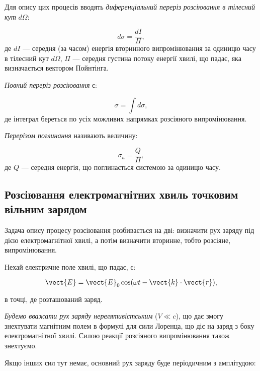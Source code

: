 Для опису цих процесів вводять \textit{диференціальний переріз розсіювання в тілесний кут} \( d\Omega \):

\begin{equation}
d\sigma = \frac{dI}{\Pi},
\label{eq:differential_cross_section}
\end{equation}
де \( dI \) --- середня (за часом) енергія вторинного випромінювання за одиницю часу в тілесний кут \( d\Omega \), \( \Pi \) — середня густина потоку
енергії хвилі, що падає, яка визначається вектором Пойнтінга.

\textit{Повний переріз розсіювання} є:

\begin{equation}
\sigma = \int d\sigma,
\label{eq:total_cross_section}
\end{equation}
де інтеграл береться по усіх можливих напрямках розсіяного випромінювання.

\textit{Перерізом поглинання} називають величину:

\begin{equation}
\sigma_a = \frac{Q}{\Pi},
\label{eq:absorption_cross_section}
\end{equation}
де \( Q \) --- середня енергія, що поглинається системою за одиницю часу.

\subsection*{Розсіювання електромагнітних хвиль точковим вільним зарядом}

Задача опису процесу розсіювання розбивається на дві: визначити рух заряду під дією електромагнітної хвилі, а потім визначити вторинне, тобто розсіяне,
випромінювання.

Нехай електричне поле хвилі, що падає, є:

\begin{equation}
\vect{E} = \vect{E}_0 \cos(\omega t - \vect{k} \cdot \vect{r}),
\label{eq:incident_wave}
\end{equation}

в точці, де розташований заряд.

\textit{Будемо вважати рух заряду нерелятивістським} (\( V \ll c \)), що дає змогу знехтувати магнітним полем в формулі для сили Лоренца, що діє на
заряд з боку електромагнітної хвилі. Силою реакції розсіяного випромінювання також знехтуємо.

Якщо інших сил тут немає, основний рух заряду буде періодичним з амплітудою:


